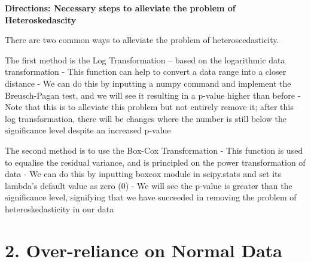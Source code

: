 \documentclass[11pt]{article}
\begin{document}
    \textbf{Directions: Necessary steps to alleviate the problem of
Heteroskedascity}

    There are two common ways to alleviate the problem of
heteroscedasticity.

The first method is the Log Transformation -- based on the logarithmic
data transformation - This function can help to convert a data range
into a closer distance - We can do this by inputting a numpy command and
implement the Breusch-Pagan test, and we will see it resulting in a
p-value higher than before - Note that this is to alleviate this problem
but not entirely remove it; after this log transformation, there will be
changes where the number is still below the significance level despite
an increased p-value

The second method is to use the Box-Cox Transformation - This function
is used to equalise the residual variance, and is principled on the
power transformation of data - We can do this by inputting boxcox module
in scipy.stats and set its lambda's default value as zero (0) - We will
see the p-value is greater than the significance level, signifying that
we have succeeded in removing the problem of heteroskedasticity in our
data

    \hypertarget{over-reliance-on-normal-data}{%
\section{2. Over-reliance on Normal
Data}\label{over-reliance-on-normal-data}}
\end{document}
